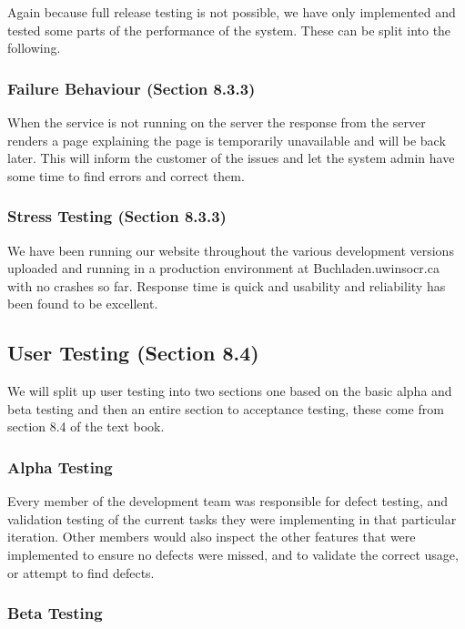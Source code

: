 \documentclass[11pt]{article}
\begin{document}
			Again because full release testing is not possible, we have only implemented and tested some parts of the performance of the system. 
			These can be split into the following.

		\subsubsection{Failure Behaviour (Section 8.3.3)}

			When the service is not running on the server the response from the server renders a page explaining the page is temporarily unavailable and will be back later. 
			This will inform the customer of the issues and let the system admin have some time to find errors and correct them.

		\subsubsection{Stress Testing (Section 8.3.3)}

			We have been running our website throughout the various development versions uploaded and running in a production environment at Buchladen.uwinsocr.ca with no crashes so far. 
			Response time is quick and usability and reliability has been found to be excellent. 

	\subsection{User Testing (Section 8.4)}
		We will split up user testing into two sections one based on the basic alpha and beta testing and then an entire section to acceptance testing, these come from section 8.4 of the text book.
		\subsubsection{Alpha Testing}

			Every member of the development team was responsible for defect testing, and validation testing of the current tasks they were implementing in that particular iteration. 
			Other members would also inspect the other features that were implemented to ensure no defects were missed, and to validate the correct usage, or attempt to find defects.

		\subsubsection{Beta Testing}
\end{document}
